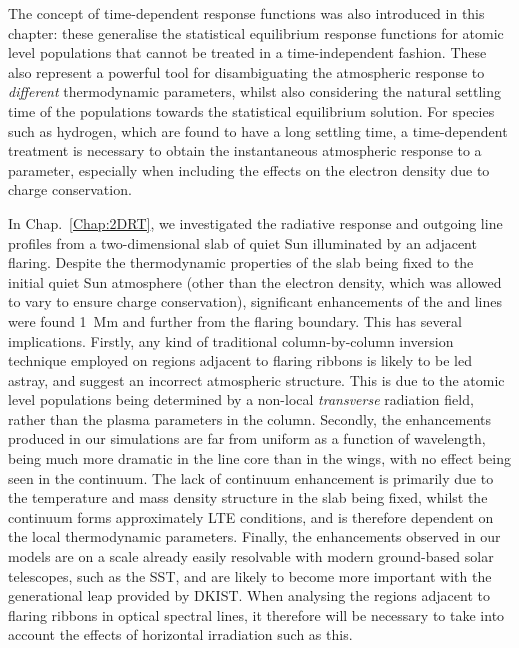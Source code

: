 The concept of time-dependent response functions was also introduced in this chapter: these generalise the statistical equilibrium response functions for atomic level populations that cannot be treated in a time-independent fashion.
These also represent a powerful tool for disambiguating the atmospheric response to \emph{different} thermodynamic parameters, whilst also considering the natural settling time of the populations towards the statistical equilibrium solution.
For species such as hydrogen, which are found to have a long settling time, a time-dependent treatment is necessary to obtain the instantaneous atmospheric response to a parameter, especially when including the effects on the electron density due to charge conservation.

In Chap.~\ref{Chap:2DRT}, we investigated the radiative response and outgoing line profiles from a two-dimensional slab of quiet Sun illuminated by an adjacent flaring.
Despite the thermodynamic properties of the slab being fixed to the initial quiet Sun atmosphere (other than the electron density, which was allowed to vary to ensure charge conservation), significant enhancements of the \Ha{} and \CaLine{} lines were found \SI{1}{\mega\m} and further from the flaring boundary.
This has several implications.
Firstly, any kind of traditional column-by-column inversion technique employed on regions adjacent to flaring ribbons is likely to be led astray, and suggest an incorrect atmospheric structure.
This is due to the atomic level populations being determined by a non-local \emph{transverse} radiation field, rather than the plasma parameters in the column.
Secondly, the enhancements produced in our simulations are far from uniform as a function of wavelength, being much more dramatic in the line core than in the wings, with no effect being seen in the continuum.
The lack of continuum enhancement is primarily due to the temperature and mass density structure in the slab being fixed, whilst the continuum forms approximately LTE conditions, and is therefore dependent on the local thermodynamic parameters.
Finally, the enhancements observed in our models are on a scale already easily resolvable with modern ground-based solar telescopes, such as the SST, and are likely to become more important with the generational leap provided by DKIST.
When analysing the regions adjacent to flaring ribbons in optical spectral lines, it therefore will be necessary to take into account the effects of horizontal irradiation such as this.

